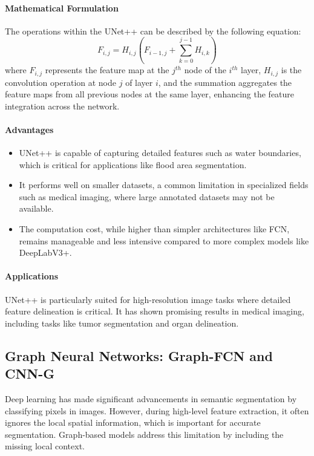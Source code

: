 \paragraph{Mathematical Formulation}
The operations within the UNet++ can be described by the following equation:
\[
F_{i,j} = H_{i,j} \left( F_{i-1,j} + \sum_{k=0}^{j-1} H_{i,k} \right)
\]
where \( F_{i,j} \) represents the feature map at the \( j^{th} \) node of the \( i^{th} \) layer, \( H_{i,j} \) is the convolution operation at node \( j \) of layer \( i \), and the summation aggregates the feature maps from all previous nodes at the same layer, enhancing the feature integration across the network.

\paragraph{Advantages}
\begin{itemize}
    \item UNet++ is capable of capturing detailed features such as water boundaries, which is critical for applications like flood area segmentation.
    \item It performs well on smaller datasets, a common limitation in specialized fields such as medical imaging, where large annotated datasets may not be available.
    \item The computation cost, while higher than simpler architectures like FCN, remains manageable and less intensive compared to more complex models like DeepLabV3+.
\end{itemize}

\paragraph{Applications}
UNet++ is particularly suited for high-resolution image tasks where detailed feature delineation is critical. It has shown promising results in medical imaging, including tasks like tumor segmentation and organ delineation.

\subsection{Graph Neural Networks: Graph-FCN and CNN-G}

Deep learning has made significant advancements in semantic segmentation by classifying pixels in images. However, during high-level feature extraction, it often ignores the local spatial information, which is important for accurate segmentation. Graph-based models address this limitation by including the missing local context.

